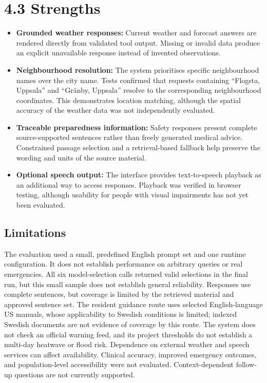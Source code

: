 \documentclass[a4paper,10pt]{article}
\begin{document}
\section*{4.3 Strengths}
\begin{itemize}
\item \textbf{Grounded weather responses:} Current weather and forecast answers are rendered directly from validated tool output. Missing or invalid data produce an explicit unavailable response instead of invented observations.
\item \textbf{Neighbourhood resolution:} The system prioritises specific neighbourhood names over the city name. Tests confirmed that requests containing ``Flogsta, Uppsala'' and ``Gr\"anby, Uppsala'' resolve to the corresponding neighbourhood coordinates. This demonstrates location matching, although the spatial accuracy of the weather data was not independently evaluated.
\item \textbf{Traceable preparedness information:} Safety responses present complete source-supported sentences rather than freely generated medical advice. Constrained passage selection and a retrieval-based fallback help preserve the wording and units of the source material.
\item \textbf{Optional speech output:} The interface provides text-to-speech playback as an additional way to access responses. Playback was verified in browser testing, although usability for people with visual impairments has not yet been evaluated.
\end{itemize}


\subsection{Limitations}
The evaluation used a small, predefined English prompt set and one runtime configuration. It does not establish performance on arbitrary queries or real emergencies. All six model-selection calls returned valid selections in the final run, but this small sample does not establish general reliability. Responses use complete sentences, but coverage is limited by the retrieved material and approved sentence set. The resident guidance route uses selected English-language US manuals, whose applicability to Swedish conditions is limited; indexed Swedish documents are not evidence of coverage by this route. The system does not check an official warning feed, and its project thresholds do not establish a multi-day heatwave or flood risk. Dependence on external weather and speech services can affect availability. Clinical accuracy, improved emergency outcomes, and population-level accessibility were not evaluated. Context-dependent follow-up questions are not currently supported.
\end{document}
